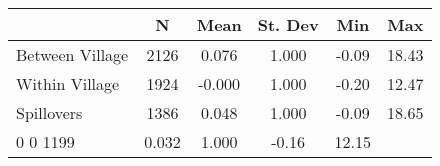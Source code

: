 \begin{tabular}{l*{5}{c}}\hline&\multicolumn{1}{c}{N}&\multicolumn{1}{c}{Mean}&\multicolumn{1}{c}{St. Dev}&\multicolumn{1}{c}{Min}&\multicolumn{1}{c}{Max}\\ \hline 
Between Village & 2126 & 0.076 & 1.000 & -0.09 & 18.43 \\
Within Village & 1924 & -0.000 & 1.000 & -0.20 & 12.47 \\
Spillovers & 1386 & 0.048 & 1.000 & -0.09 & 18.65 \\
0 0 1199 & 0.032 & 1.000 & -0.16 & 12.15 \\
\hline \end{tabular}
